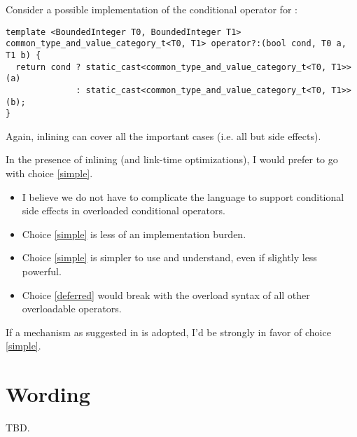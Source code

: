 Consider a possible implementation of the conditional operator for :
\smallskip\begin{lstlisting}[style=Vc]
template <BoundedInteger T0, BoundedInteger T1>
common_type_and_value_category_t<T0, T1> operator?:(bool cond, T0 a, T1 b) {
  return cond ? static_cast<common_type_and_value_category_t<T0, T1>>(a)
              : static_cast<common_type_and_value_category_t<T0, T1>>(b);
}
\end{lstlisting}
Again, inlining can cover all the important cases (i.e. all but side effects).

In the presence of inlining (and link-time optimizations), I would prefer to go with choice \ref{simple}.
\begin{itemize}
  \item I believe we do not have to complicate the language to support conditional side effects in overloaded conditional operators.
  \item Choice \ref{simple} is less of an implementation burden.
  \item Choice \ref{simple} is simpler to use and understand, even if slightly less powerful.
  \item Choice \ref{deferred} would break with the overload syntax of all other overloadable operators.
\end{itemize}
If a mechanism as suggested in \textcite{P0927R0} is adopted, I'd be strongly in favor of choice \ref{simple}.

\section{Wording}
TBD.


